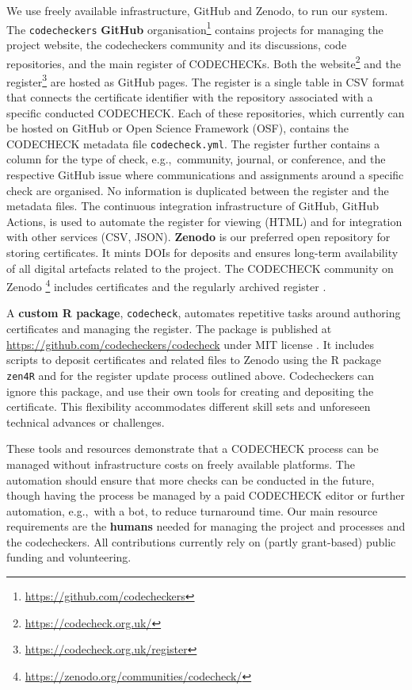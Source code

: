 \documentclass[12pt]{article}
\begin{document}
We use freely available infrastructure, GitHub and Zenodo, to run our
system.  The \texttt{codecheckers} \textbf{GitHub}
organisation\footnote{ \url{https://github.com/codecheckers}} contains
projects for managing the project website, the codecheckers community
and its discussions, code repositories, and the main register of
CODECHECKs. Both the website\footnote{
  \url{https://codecheck.org.uk/}} and the register\footnote{
  \url{https://codecheck.org.uk/register}} are hosted as GitHub
pages. The register is a single table in CSV format that connects the
certificate identifier with the repository associated with a specific
conducted CODECHECK. Each of these repositories, which currently can
be hosted on GitHub or Open Science Framework (OSF), contains the
CODECHECK metadata file \texttt{codecheck.yml}. The register further
contains a column for the type of check, e.g.,~community, journal, or
conference, and the respective GitHub issue where communications and
assignments around a specific check are organised. No information is
duplicated between the register and the metadata files. The continuous
integration infrastructure of GitHub, GitHub Actions, is used to
automate the register for viewing (HTML) and for integration with
other services (CSV, JSON).  \textbf{Zenodo} is our preferred open repository for
storing certificates. It mints DOIs for deposits and ensures
long-term availability of all digital artefacts related to the
project. The CODECHECK community on Zenodo
\footnote{\url{https://zenodo.org/communities/codecheck/}} includes
certificates and the regularly archived register
\cite{codecheck_register_jan2021}.

A \textbf{custom R package}, \texttt{codecheck}, automates
repetitive tasks around authoring certificates and managing the
register. The package is published at
\url{https://github.com/codecheckers/codecheck} under MIT license
\cite{stephen_eglen_codecheckerscodecheck_2021}.
It includes scripts to deposit certificates and related
files to Zenodo using the R package \texttt{zen4R} \cite{zen4r} and
for the register update process outlined above.  Codecheckers can
ignore this package, and use their own tools for creating
and depositing the certificate.  This flexibility  accommodates
different skill sets and unforeseen technical advances or challenges.

These tools and resources demonstrate that a CODECHECK process can be
managed without infrastructure costs on freely available platforms.
The automation should ensure that more checks can be conducted in the
future, though having the process be managed by a paid CODECHECK
editor or further automation, e.g.,~with a bot, to reduce turnaround
time. Our main resource requirements are the \textbf{humans} needed for managing
the project and processes and the codecheckers.  All contributions
currently rely on (partly grant-based) public funding and
volunteering.
\end{document}
